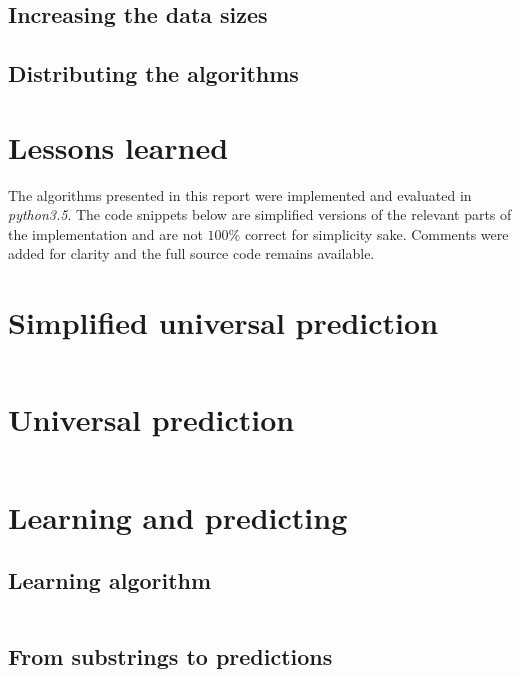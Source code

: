\documentclass[a4paper,12pt]{article}
\begin{document}
  \subsection{Increasing the data sizes}

  \subsection{Distributing the algorithms}

\section*{Lessons learned}

  \lipsum[8-9]

\clearpage
\begin{appendices}

  The algorithms presented in this report were implemented and evaluated
  in \emph{python3.5}. The code snippets below are simplified versions of
  the relevant parts of the implementation and are not $100\%$ correct for
  simplicity sake. Comments were added for clarity and the full source code
  remains available.

  \section{Simplified universal prediction}

    \inputminted[linenos]{python}{code/simplified.py}

  \clearpage
  \section{Universal prediction}

    \inputminted[linenos]{python}{code/complete.py}

  \clearpage
  \section{Learning and predicting}

    \subsection{Learning algorithm}

      \inputminted[linenos]{python}{code/learning.py}

    \clearpage
    \subsection{From substrings to predictions}

      \inputminted[linenos]{python}{code/predicting.py}

\end{appendices}
\end{document}
